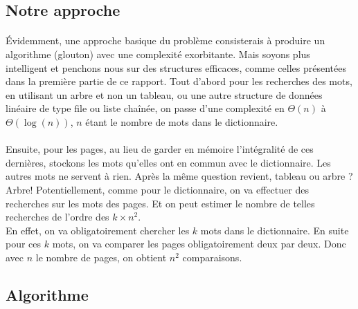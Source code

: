 \documentclass[a4paper]{article}
\begin{document}
	
		\subsection{Notre approche}
		
			\paragraph{}{
			Évidemment, une approche basique du problème consisterais à produire un algorithme (glouton) avec une complexité
			exorbitante. Mais soyons plus intelligent et penchons nous sur des structures efficaces, comme celles présentées
			dans la première partie de ce rapport. Tout d'abord pour les recherches des mots, en utilisant un arbre et non
			un tableau, ou une autre structure de données linéaire de type file ou liste chaînée, on passe d'une complexité
			en $\Theta(n)$ à $\Theta(\log(n))$, $n$ étant le nombre de mots dans le dictionnaire.
			}
			\paragraph{}{
			Ensuite, pour les pages, au lieu de garder en mémoire l'intégralité de ces dernières, stockons les mots qu'elles
			ont en commun avec le dictionnaire. Les autres mots ne servent à rien. Après la même question revient, tableau
			ou arbre ? Arbre! Potentiellement, comme pour le dictionnaire, on va effectuer des recherches sur les mots des pages.
			Et on peut estimer le nombre de telles recherches de l'ordre des $k \times n^{2}$. \\
			En effet, on va obligatoirement chercher les $k$ mots dans le dictionnaire. En suite pour ces $k$ mots, on va comparer
			les pages obligatoirement deux par deux. Donc avec $n$ le nombre de pages, on obtient $n^{2}$ comparaisons.
			}

		\subsection{Algorithme}
\end{document}
